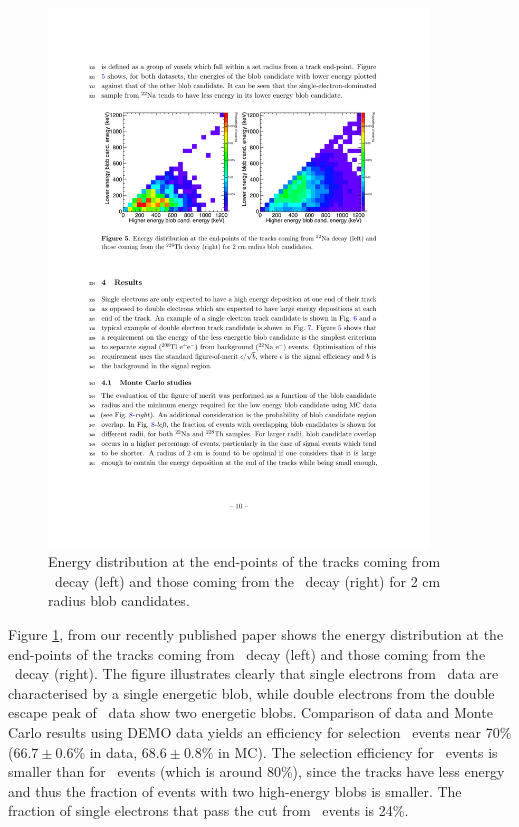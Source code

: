 \begin{figure}
\centering
\includegraphics[width=0.9\textwidth]{img2/blobsData.pdf}
\caption{\small Energy distribution at the end-points of the tracks coming from \NA\ decay (left) and those coming from the \TL\ decay (right) for 2 cm radius blob candidates.}\label{fig.BL}
\end{figure}

Figure \ref{fig.BL}, from our recently published paper \cite{PFerrario:2015ina} shows the energy distribution at the end-points of the tracks coming from \NA\ decay (left) and those coming from the \TL\ decay (right). The figure illustrates clearly that single electrons from \NA\ data are characterised by a single energetic blob, while double electrons from the double escape peak of \TL\ data show two energetic blobs. Comparison of data and Monte Carlo results using DEMO data yields an efficiency for selection \TL\ events near 70\% ($66.7 \pm 0.6$\% in data, $68.6 \pm 0.8$\% in MC). The selection efficiency for \TL\ events is smaller than for \bbonu\ events (which is around 80\%), since the tracks have less energy and thus the fraction of events with two high-energy blobs is smaller. The fraction of single electrons that pass the cut from \NA\ events is 
24\%. 

